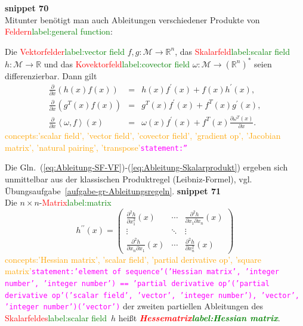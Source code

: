 \documentclass[a4paper,twoside,english,ngerman,deutsch,german,sectrefs,envcountsame,envcountchap]{svmono}
\newcommand{\setref}[2]{\textcolor{red}{#1}\textcolor{green}{#2}}
\newcommand{\snippet}[1]{\textbf{snippet #1}\\}
\newcommand{\eqnote}[2]{\textcolor{orange}{#1}\textcolor{magenta}{\texttt{#2}}}
\begin{document}
\snippet{70}
Mitunter benötigt man auch Ableitungen verschiedener Produkte von
\setref{Feldern}{label:general function}:
\begin{proposition}
\label{pro:Ableitungsregeln-Felder}Die \setref{Vektorfelder}{label:vector field} $f,g:\mathcal{M}{\to{\mathbb{R}}}^{n}$,
das \setref{Skalarfeld}{label:scalar field} $h:\mathcal{M}\to{\mathbb{R}}$ und das \setref{Kovektorfeld}{label:covector field} $\omega:\mathcal{M}\to({\mathbb{R}}^{n})^{*}$
seien differenzierbar. Dann gilt \begin{subequations}\label{eq:Ableitungsregeln}
\begin{eqnarray}
\frac{\partial}{\partial x}\left(h(x)f(x)\right) & = & h(x)f^{\prime}(x)+f(x)h^{\prime}(x),\label{eq:Ableitung-SF-VF}\\
\frac{\partial}{\partial x}\left(g^{T}(x)f(x)\right) & = & g^{T}(x)f^{\prime}(x)+f^{T}(x)g^{\prime}(x),\label{eq:Ableitung-VF-VF}\\
\frac{\partial}{\partial x}\left\langle \omega,f\right\rangle (x) & = & \omega(x)f^{\prime}(x)+f^{T}(x)\frac{\partial\omega^{T}(x)}{\partial x}.\label{eq:Ableitung-Skalarprodukt}
\end{eqnarray}
\end{subequations}\eqnote{concepts:'scalar field', 'vector field', 'covector field', 'gradient op', 'Jacobian matrix', 'natural pairing', 'transpose'}{statement:''}
\end{proposition}
Die Gln.~(\ref{eq:Ableitung-SF-VF})-(\ref{eq:Ableitung-Skalarprodukt})
ergeben sich unmittelbar aus der klassischen Produktregel (Leibniz-Formel),
vgl. Übungsaufgabe~\ref{aufgabe-gr-Ableitungsregeln}.
\snippet{71}
Die $n\times n$-\setref{Matrix}{label:matrix}
\[
h^{\prime\prime}(x)=\left(\begin{array}{ccc}
\frac{\partial^{2}h}{\partial x_{1}^{2}}(x) & \cdots & \frac{\partial^{2}h}{\partial x_{1}\partial x_{n}}(x)\\
\vdots & \ddots & \vdots\\
\frac{\partial^{2}h}{\partial x_{n}\partial x_{1}}(x) & \cdots & \frac{\partial^{2}h}{\partial x_{n}^{2}}(x)
\end{array}\right)
\]\eqnote{concepts:'Hessian matrix', 'scalar field', 'partial derivative op', 'square matrix'}{statement:'element of sequence'('Hessian matrix', 'integer number', 'integer number') == 'partial derivative op'('partial derivative op'('scalar field', 'vector', 'integer number'), 'vector', 'integer number')('vector')}
der zweiten partiellen Ableitungen des \setref{Skalarfeldes}{label:scalar field}~$h$ heißt \textbf{\em \setref{Hessematrix}{label:Hessian matrix}}.
\end{document}
